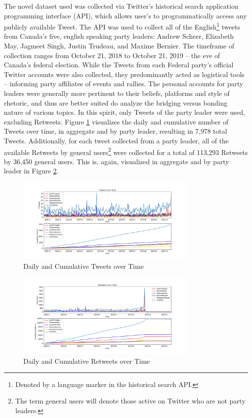The novel dataset used was collected via Twitter's historical search application
programming interface (API), which allows user's to programmatically access any
publicly available Tweet. The API was used to collect all of the
English\footnote{Denoted by a language marker in the historical search API.}
tweets from Canada's five, english speaking party leaders: Andrew Scheer,
Elizabeth May, Jagmeet Singh, Justin Trudeau, and Maxime Bernier. The timeframe
of collection ranges from October 21, 2018 to October 21, 2019 -- the eve of
Canada’s federal election. While the Tweets from each Federal party’s official
Twitter accounts were also collected, they predominantly acted as logistical
tools – informing party affiliates of events and rallies. The personal accounts
for party leaders were generally more pertinent to their beliefs, platforms and
style of rhetoric, and thus are better suited do analyze the bridging versus
bonding nature of various topics. In this spirit, only Tweets of the party
leader were used, excluding Retweets. Figure \ref{fig:tweets_over_time}
visualizes the daily and cumulative number of Tweets over time, in aggregate and
by party leader, resulting in 7,978 total Tweets. Additionally, for each tweet collected from a party leader, all of the available
Retweets by general users\footnote{The term general users will denote those
active on Twitter who are not party leaders.} were collected for a total of
113,293 Retweets by 36,450 general users. This is, again, visualized in
aggregate and by party leader in Figure \ref{fig:retweets_over_time}.

\begin{figure}[h!]
  \centering
  \includegraphics[width=0.8\textwidth]{figures/tweets_over_time}
  \caption[Daily and Cumulative Tweets over Time]{Daily and Cumulative Tweets over Time}
  \label{fig:tweets_over_time}
\end{figure}

\begin{figure}[h!]
  \centering
  \includegraphics[width=0.8\textwidth]{figures/retweets_over_time}
  \caption[Daily and Cumulative Retweets over Time]{Daily and Cumulative Retweets over Time}
  \label{fig:retweets_over_time}
\end{figure}

